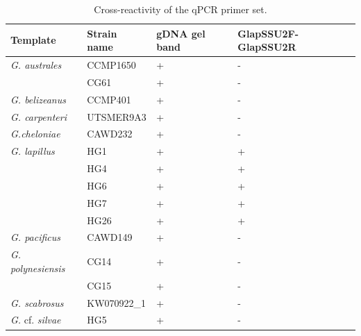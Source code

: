 \documentclass[12pt]{article}
\begin{document}
\begin{table}
\caption{Cross-reactivity of the qPCR primer set.}
\label{tbl:CrossreactTable}
\begin{tabular}{ | p{4cm} | p{3cm} | p{2cm} | p{2.5cm} | }%
\hline
\textbf{Template} & \textbf{Strain name} & \textbf{gDNA gel band} & \textbf{GlapSSU2F-GlapSSU2R} \\%
\hline
\emph{G. australes} & CCMP1650 &+&-\\%
\hline
& CG61 &+&-\\%
\hline
\emph{G. belizeanus}&CCMP401&+&-\\%
\hline
\emph{G. carpenteri}&UTSMER9A3&+&-\\%
\hline
\emph{G.cheloniae}&CAWD232&+&-\\%
\hline
\emph{G. lapillus}&HG1&+&+\\%
\hline
&HG4&+&+\\%
\hline
&HG6&+&+\\%
\hline
&HG7&+&+\\%
\hline
&HG26&+&+\\%
\hline
\emph{G. pacificus}&CAWD149&+&-\\%
\hline
\emph{G. polynesiensis}&CG14&+&-\\%
\hline
&CG15&+&-\\%
\hline
\emph{G. scabrosus}&KW070922\_1&+&-\\%
\hline
\emph{G.} cf. \emph{silvae}&HG5&+&-\\%
\hline
\end{tabular}
\end{table}
\FloatBarrier
\end{document}
